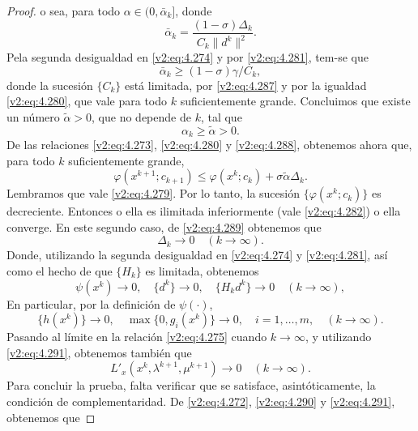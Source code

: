 \begin{proof}
    o sea, para todo $\alpha \in (0, \bar{\alpha}_k]$, donde
    \[
        \bar{\alpha}_k = \frac{(1 - \sigma)\Delta_k}{C_k\|d^k\|^2}.
    \]
    Pela segunda desigualdad en \eqref{v2:eq:4.274} y por \eqref{v2:eq:4.281}, tem-se que
    \[
        \bar{\alpha}_k \ge (1 - \sigma)\gamma/C_k,
    \]
    donde la sucesión $\{C_k\}$ está limitada, por \eqref{v2:eq:4.287} y por la igualdad \eqref{v2:eq:4.280}, que vale para todo $k$ suficientemente grande. Concluimos que existe un número $\tilde{\alpha} > 0$, que no depende de $k$, tal que
    \begin{equation}
        \alpha_k \ge \tilde{\alpha} > 0.
        \label{v2:eq:4.288}
    \end{equation}
    De las relaciones \eqref{v2:eq:4.273}, \eqref{v2:eq:4.280} y \eqref{v2:eq:4.288}, obtenemos ahora que, para todo $k$ suficientemente grande,
    \begin{equation}
        \varphi(x^{k+1}; c_{k+1}) \le \varphi(x^k; c_k) + \sigma\tilde{\alpha}\Delta_k.
        \label{v2:eq:4.289}
    \end{equation}
    Lembramos que vale \eqref{v2:eq:4.279}. Por lo tanto, la sucesión $\{\varphi(x^k; c_k)\}$ es decreciente. Entonces o ella es ilimitada inferiormente (vale \eqref{v2:eq:4.282}) o ella converge. En este segundo caso, de \eqref{v2:eq:4.289} obtenemos que
    \begin{equation}
        \Delta_k \to 0 \quad (k \to \infty).
        \label{v2:eq:4.290}
    \end{equation}
    Donde, utilizando la segunda desigualdad en \eqref{v2:eq:4.274} y \eqref{v2:eq:4.281}, así como el hecho de que $\{H_k\}$ es limitada, obtenemos
    \begin{equation}
        \psi(x^k) \to 0, \quad \{d^k\} \to 0, \quad \{H_k d^k\} \to 0 \quad (k \to \infty),
        \label{v2:eq:4.291}
    \end{equation}
    En particular, por la definición de $\psi(\cdot)$,
    \begin{equation}
        \{h(x^k)\} \to 0, \quad \max\{0, g_i(x^k)\} \to 0, \quad i = 1, \dots, m, \quad (k \to \infty).
        \label{v2:eq:4.292}
    \end{equation}
    Pasando al límite en la relación \eqref{v2:eq:4.275} cuando $k \to \infty$, y utilizando \eqref{v2:eq:4.291}, obtenemos también que
    \[
        L'_x(x^k, \lambda^{k+1}, \mu^{k+1}) \to 0 \quad (k \to \infty).
    \]
    Para concluir la prueba, falta verificar que se satisface, asintóticamente, la condición de complementaridad. De \eqref{v2:eq:4.272}, \eqref{v2:eq:4.290} y \eqref{v2:eq:4.291}, obtenemos que

\end{proof}
